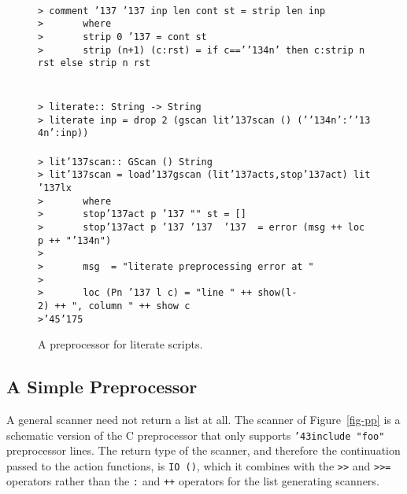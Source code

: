\begin{figure}
{\mbox{\tt }\\[-4pt]
\mbox{\tt >\ comment\ {\char'137}\ {\char'137}\ inp\ len\ cont\ st\ =\ strip\ len\ inp}\\
\mbox{\tt >\ \ \ \ \ \ \ where}\\
\mbox{\tt >\ \ \ \ \ \ \ strip\ 0\ {\char'137}\ =\ cont\ st}\\
\mbox{\tt >\ \ \ \ \ \ \ strip\ (n+1)\ (c:rst)\ =\ if\ c=='{\char'134}n'\ then\ c:strip\ n\ rst\ else\ strip\ n\ rst}\\
\mbox{\tt }\\[-4pt]
\mbox{\tt }\\[-4pt]
\mbox{\tt >\ literate::\ String\ ->\ String}\\
\mbox{\tt >\ literate\ inp\ =\ drop\ 2\ (gscan\ lit{\char'137}scan\ ()\ ('{\char'134}n':'{\char'134}n':inp))}\\
\mbox{\tt }\\[-4pt]
\mbox{\tt >\ lit{\char'137}scan::\ GScan\ ()\ String}\\
\mbox{\tt >\ lit{\char'137}scan\ =\ load{\char'137}gscan\ (lit{\char'137}acts,stop{\char'137}act)\ lit{\char'137}lx}\\
\mbox{\tt >\ \ \ \ \ \ \ where}\\
\mbox{\tt >\ \ \ \ \ \ \ stop{\char'137}act\ p\ {\char'137}\ ""\ st\ =\ []}\\
\mbox{\tt >\ \ \ \ \ \ \ stop{\char'137}act\ p\ {\char'137}\ {\char'137}\ \ {\char'137}\ \ =\ error\ (msg\ ++\ loc\ p\ ++\ "{\char'134}n")}\\
\mbox{\tt >}\\
\mbox{\tt >\ \ \ \ \ \ \ msg\ \ =\ "literate\ preprocessing\ error\ at\ "}\\
\mbox{\tt >}\\
\mbox{\tt >\ \ \ \ \ \ \ loc\ (Pn\ {\char'137}\ l\ c)\ =\ "line\ "\ ++\ show(l-2)\ ++\ ",\ column\ "\ ++\ show\ c}\\
\mbox{\tt >{\char'45}{\char'175}}
}
\caption{A preprocessor for literate scripts.}\label{fig-lit}
\end{figure}


\subsection{A Simple Preprocessor}
\label{sec-pp}

A general scanner need not return a list at all.  The scanner of
Figure~\ref{fig-pp} is a schematic version of the C preprocessor that only
supports \mbox{\tt {\char'43}include\ "foo"} preprocessor lines.  The return type of the scanner,
and therefore the continuation passed to the action functions, is \mbox{\tt IO\ ()},
which it combines with the \mbox{\tt >>} and \mbox{\tt >>=} operators rather than the \mbox{\tt :} and
\mbox{\tt ++} operators for the list generating scanners.

